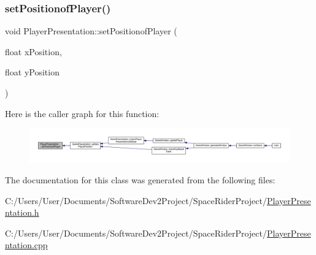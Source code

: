 \subsubsection{\texorpdfstring{set\+Positionof\+Player()}{setPositionofPlayer()}}
{\footnotesize\ttfamily void Player\+Presentation\+::set\+Positionof\+Player (\begin{DoxyParamCaption}\item[{float}]{x\+Position,  }\item[{float}]{y\+Position }\end{DoxyParamCaption})}

Here is the caller graph for this function\+:
\nopagebreak
\begin{figure}[H]
\begin{center}
\leavevmode
\includegraphics[width=350pt]{class_player_presentation_aef6ba74848a34fb93528062bda98059e_icgraph}
\end{center}
\end{figure}


The documentation for this class was generated from the following files\+:\begin{DoxyCompactItemize}
\item 
C\+:/\+Users/\+User/\+Documents/\+Software\+Dev2\+Project/\+Space\+Rider\+Project/\hyperlink{_player_presentation_8h}{Player\+Presentation.\+h}\item 
C\+:/\+Users/\+User/\+Documents/\+Software\+Dev2\+Project/\+Space\+Rider\+Project/\hyperlink{_player_presentation_8cpp}{Player\+Presentation.\+cpp}\end{DoxyCompactItemize}
